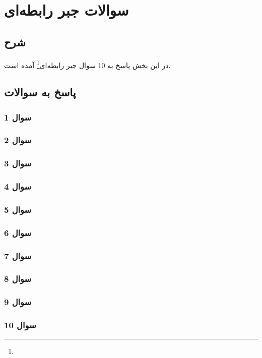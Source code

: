 \documentclass{book}
\begin{document}
        \chapter{سوالات جبر رابطه‌ای}
        \section{شرح}
        در این بخش پاسخ به 10 سوال جبر رابطه‌ای\footnote{} آمده است.
        \section{پاسخ به سوالات}
        \subsection{سوال 1}


        \subsection{سوال 2}


        \subsection{سوال 3}


        \subsection{سوال 4}


        \subsection{سوال 5}


        \subsection{سوال 6}


        \subsection{سوال 7}


        \subsection{سوال 8}


        \subsection{سوال 9}


        \subsection{سوال 10}
\end{document}
